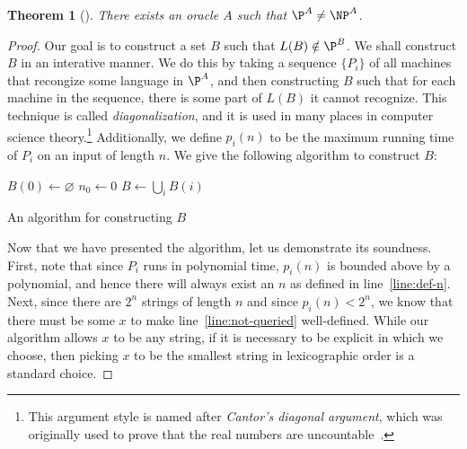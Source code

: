 \documentclass{reedthesis}
\theoremstyle{plain}
\newtheorem{thm}{Theorem}[section]
\theoremstyle{definition}
\theoremstyle{remark}
\numberwithin{equation}{section}
\begin{document}
\begin{thm}[{\cite[Theorem 3]{BGS75}}]\label{thm:p-np-nrel}
  There exists an oracle $A$ such that $\P^{A} \ne \NP^{A}$.
\end{thm}

\begin{proof}
  Our goal is to construct a set $B$ such that $L(B) \notin \P^{B}$. We shall
  construct $B$ in an interative manner. We do this by taking a sequence
  $\{P_{i}\}$ of all machines that recongize some language in $\P^{A}$, and then
  constructing $B$ such that for each machine in the sequence, there is some
  part of $L(B)$ it cannot recognize. This technique is called
  \emph{diagonalization}, and it is used in many places in computer science
  theory.\footnote{This argument style is named after \emph{Cantor's diagonal
      argument}, which was originally used to prove that the real numbers are
    uncountable~\cite[Thm. 2.14]{Ru76}.} Additionally, we define $p_{i}(n)$ to
  be the maximum running time of $P_{i}$ on an input of length $n$. We give the
  following algorithm to construct $B$:

  \begin{algorithm}[H]
    $B(0) \leftarrow \varnothing$\;
    $n_{0} \leftarrow 0$\;
    $B \leftarrow \bigcup_{i}B(i)$\;
    \caption{An algorithm for constructing $B$}\label{alg:construct-b}
  \end{algorithm}

  Now that we have presented the algorithm, let us demonstrate its soundness.
  First, note that since $P_{i}$ runs in polynomial time, $p_{i}(n)$ is bounded
  above by a polynomial, and hence there will always exist an $n$ as defined in
  line~\ref{line:def-n}. Next, since there are $2^{n}$ strings of length $n$ and
  since $p_{i}(n) < 2^{n}$, we know that there must be some $x$ to make
  line~\ref{line:not-queried} well-defined. While our algorithm allows $x$ to be
  any string, if it is necessary to be explicit in which we choose, then picking
  $x$ to be the smallest string in lexicographic order is a standard choice.


\end{proof}
\end{document}

